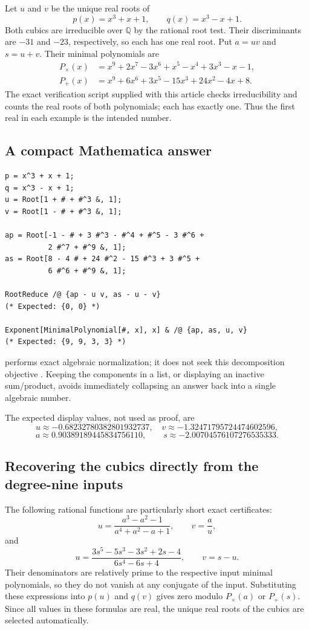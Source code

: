 \documentclass[11pt,a4paper]{article}
\theoremstyle{definition}\newtheorem{definition}[theorem]{Definition}
\theoremstyle{remark}\newtheorem{remark}[theorem]{Remark}
\newcommand{\Q}{\mathbb Q}
\newcommand{\code}[1]{\texttt{\detokenize{#1}}}
\begin{document}
Let $u$ and $v$ be the unique real roots of
\[
 p(x)=x^3+x+1,\qquad q(x)=x^3-x+1.
\]
Both cubics are irreducible over $\Q$ by the rational root test. Their
discriminants are $-31$ and $-23$, respectively, so each has one real root.
Put $a=uv$ and $s=u+v$. Their minimal polynomials are
\begin{align}
 P_\times(x)&=x^9+2x^7-3x^6+x^5-x^4+3x^3-x-1,\label{eq:productpoly}\\
 P_+(x)&=x^9+6x^6+3x^5-15x^3+24x^2-4x+8.\label{eq:sumpoly}
\end{align}
The exact verification script supplied with this article checks
irreducibility and counts the real roots of both polynomials; each has
exactly one. Thus the first real \code{Root} in each example is the intended
number.

\subsection{A compact Mathematica answer}

\begin{lstlisting}
p = x^3 + x + 1;
q = x^3 - x + 1;
u = Root[1 + # + #^3 &, 1];
v = Root[1 - # + #^3 &, 1];

ap = Root[-1 - # + 3 #^3 - #^4 + #^5 - 3 #^6 +
          2 #^7 + #^9 &, 1];
as = Root[8 - 4 # + 24 #^2 - 15 #^3 + 3 #^5 +
          6 #^6 + #^9 &, 1];

RootReduce /@ {ap - u v, as - u - v}
(* Expected: {0, 0} *)

Exponent[MinimalPolynomial[#, x], x] & /@ {ap, as, u, v}
(* Expected: {9, 9, 3, 3} *)
\end{lstlisting}
\code{RootReduce} performs exact algebraic normalization; it does not seek
this decomposition objective \cite{rootreduce}. Keeping the components in
a list, or displaying an inactive sum/product, avoids immediately collapsing
an answer back into a single algebraic number.

The expected display values, not used as proof, are
\[
 u\approx-0.68232780382801932737,\quad
 v\approx-1.32471795724474602596,
\]
\[
 a\approx0.90389189445834756110,\qquad
 s\approx-2.00704576107276535333.
\]

\subsection{Recovering the cubics directly from the degree-nine inputs}

The following rational functions are particularly short exact certificates:
\begin{equation}
 u=\frac{a^3-a^2-1}{a^4+a^2-a+1},\qquad v=\frac{a}{u},
 \label{eq:recoverproduct}
\end{equation}
and
\begin{equation}
 u=\frac{3s^5-5s^3-3s^2+2s-4}{6s^4-6s+4},\qquad v=s-u.
 \label{eq:recoversum}
\end{equation}
Their denominators are relatively prime to the respective input minimal
polynomials, so they do not vanish at any conjugate of the input. Substituting
these expressions into $p(u)$ and $q(v)$ gives zero modulo
$P_\times(a)$ or $P_+(s)$. Since all values in these formulas are real, the
unique real roots of the cubics are selected automatically.
\end{document}
